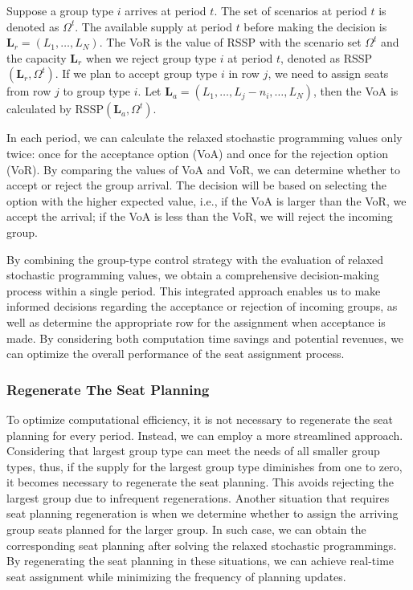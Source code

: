 Suppose a group type $i$ arrives at period $t$. The set of scenarios at period $t$ is denoted as $\Omega^{t}$. The available supply at period $t$ before making the decision is $\mathbf{L}_{r} = (L_1, \ldots, L_N)$. The VoR is the value of RSSP with the scenario set $\Omega^{t}$ and the capacity $\mathbf{L}_{r}$ when we reject group type $i$ at period $t$, denoted as RSSP$(\mathbf{L}_{r}, \Omega^{t})$. If we plan to accept group type $i$ in row $j$, we need to assign seats from row $j$ to group type $i$. Let $\mathbf{L}_{a}= (L_1, \ldots, L_j-n_{i}, \ldots, L_N)$, then the VoA is calculated by RSSP$(\mathbf{L}_{a}, \Omega^{t})$.

In each period, we can calculate the relaxed stochastic programming values only twice: once for the acceptance option (VoA) and once for the rejection option (VoR). By comparing the values of VoA and VoR, we can determine whether to accept or reject the group arrival. The decision will be based on selecting the option with the higher expected value, i.e., if the VoA is larger than the VoR, we accept the arrival; if the VoA is less than the VoR, we will reject the incoming group.


By combining the group-type control strategy with the evaluation of relaxed stochastic programming values, we obtain a comprehensive decision-making process within a single period. This integrated approach enables us to make informed decisions regarding the acceptance or rejection of incoming groups, as well as determine the appropriate row for the assignment when acceptance is made. By considering both computation time savings and potential revenues, we can optimize the overall performance of the seat assignment process.


\subsubsection{Regenerate The Seat Planning}
To optimize computational efficiency, it is not necessary to regenerate the seat planning for every
period. Instead, we can employ a more streamlined approach. Considering that largest group type can
meet the needs of all smaller group types, thus, if the supply for the largest group type diminishes from one to zero, it becomes necessary to regenerate the seat planning. This avoids rejecting the largest group due to infrequent regenerations. Another situation that requires seat planning regeneration is when we determine whether to assign the arriving group seats planned for the larger group. In such case, we can obtain the corresponding seat planning after solving the relaxed stochastic programmings. By regenerating the seat planning in these situations, we can achieve real-time seat assignment while minimizing the frequency of planning updates.

